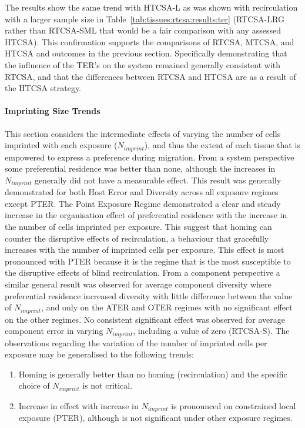 The results show the same trend with HTCSA-L as was shown with recirculation with a larger sample size in Table~\ref{tab:tissues:rtcsa:results:ter} (RTCSA-LRG rather than RTCSA-SML that would be a fair comparison with any assessed HTCSA). This confirmation supports the comparisons of RTCSA, MTCSA, and HTCSA and outcomes in the previous section. Specifically demonstrating that the influence of the TER's on the system remained generally consistent with RTCSA, and that the differences between RTCSA and HTCSA are as a result of the HTCSA strategy.


%
%
\paragraph{Imprinting Size Trends}
This section considers the intermediate effects of varying the number of cells imprinted with each exposure ($N_{imprint}$), and thus the extent of each tissue that is empowered to express a preference during migration.
From a system perspective some preferential residence was better than none, although the increases in $N_{imprint}$ generally did not have a measurable effect. This result was generally demonstrated for both Host Error and Diversity across all exposure regimes except PTER. The Point Exposure Regime demonstrated a clear and steady increase in the organisation effect of preferential residence with the increase in the number of cells imprinted per exposure. This suggest that homing can counter the disruptive effects of recirculation, a behaviour that gracefully increases with the number of imprinted cells per exposure. This effect is most pronounced with PTER because it is the regime that is the most susceptible to the disruptive effects of blind recirculation.
From a component perspective a similar general result was observed for average component diversity where preferential residence increased diversity with little difference between the value of $N_{imprint}$, and only on the ATER and OTER regimes with no significant effect on the other regimes. No consistent significant effect was observed for average component error in varying $N_{imprint}$, including a value of zero (RTCSA-S).
The observations regarding the variation of the number of imprinted cells per exposure may be generalised to the following trends: 

\begin{enumerate}
	\item Homing is generally better than no homing (recirculation) and the specific choice of $N_{imprint}$ is not critical.
	\item Increase in effect with increase in $N_{imprint}$ is pronounced on constrained local exposure (PTER), although is not significant under other exposure regimes.
\end{enumerate}

